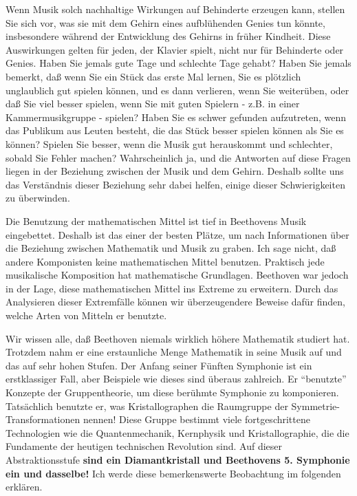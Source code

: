 Wenn Musik solch nachhaltige Wirkungen auf Behinderte erzeugen kann, stellen Sie sich vor, was sie mit dem Gehirn eines aufblühenden Genies tun könnte, insbesondere während der Entwicklung des Gehirns in früher Kindheit.
Diese Auswirkungen gelten für jeden, der Klavier spielt, nicht nur für Behinderte oder Genies.
Haben Sie jemals gute Tage und schlechte Tage gehabt?
Haben Sie jemals bemerkt, daß wenn Sie ein Stück das erste Mal lernen, Sie es plötzlich unglaublich gut spielen können, und es dann verlieren, wenn Sie weiterüben, oder daß Sie viel besser spielen, wenn Sie mit guten Spielern - z.B. in einer Kammermusikgruppe - spielen?
Haben Sie es schwer gefunden aufzutreten, wenn das Publikum aus Leuten besteht, die das Stück besser spielen können als Sie es können?
Spielen Sie besser, wenn die Musik gut herauskommt und schlechter, sobald Sie Fehler machen?
Wahrscheinlich ja, und die Antworten auf diese Fragen liegen in der Beziehung zwischen der Musik und dem Gehirn.
Deshalb sollte uns das Verständnis dieser Beziehung sehr dabei helfen, einige dieser Schwierigkeiten zu überwinden.


\hypertarget{c1iv4Gruppe}{}

Die Benutzung der mathematischen Mittel ist tief in Beethovens Musik eingebettet.
Deshalb ist das einer der besten Plätze, um nach Informationen über die Beziehung zwischen Mathematik und Musik zu graben.
Ich sage nicht, daß andere Komponisten keine mathematischen Mittel benutzen.
Praktisch jede musikalische Komposition hat mathematische Grundlagen.
Beethoven war jedoch in der Lage, diese mathematischen Mittel ins Extreme zu erweitern.
Durch das Analysieren dieser Extremfälle können wir überzeugendere Beweise dafür finden, welche Arten von Mitteln er benutzte.

Wir wissen alle, daß Beethoven niemals wirklich höhere Mathematik studiert hat.
Trotzdem nahm er eine erstaunliche Menge Mathematik in seine Musik auf und das auf sehr hohen Stufen.
Der Anfang seiner Fünften Symphonie ist ein erstklassiger Fall, aber Beispiele wie dieses sind überaus zahlreich.
Er \enquote{benutzte} Konzepte der Gruppentheorie, um diese berühmte Symphonie zu komponieren.
Tatsächlich benutzte er, was Kristallographen die Raumgruppe der Symmetrie-Transformationen nennen!
Diese Gruppe bestimmt viele fortgeschrittene Technologien wie die Quantenmechanik, Kernphysik und Kristallographie, die die Fundamente der heutigen technischen Revolution sind.
Auf dieser Abstraktionsstufe \textbf{sind ein Diamantkristall und Beethovens 5. Symphonie ein und dasselbe!}
Ich werde diese bemerkenswerte Beobachtung im folgenden erklären.

